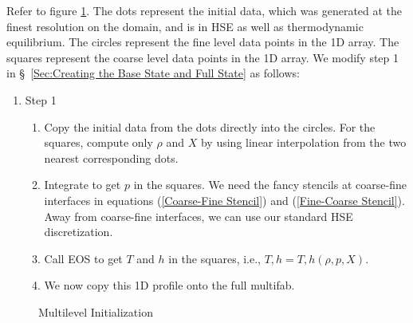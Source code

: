 \documentclass[11pt]{article}
\begin{document}
Refer to figure \ref{Fig:Multilevel Initialization}.  The dots represent the initial data, which was generated at the finest resolution on the domain, and is in HSE as well as thermodynamic equilibrium.  The circles represent the fine level data points in the 1D array.  The squares represent the coarse level data points in the 1D array.  We modify step 1 in \S~\ref{Sec:Creating the Base State and Full State} as follows:
\begin{enumerate}
\item Step 1
\begin{enumerate}
\item Copy the initial data from the dots directly into the circles.  For the squares, compute only $\rho$ and $X$ by using linear interpolation from the two nearest corresponding dots.
\item Integrate to get $p$ in the squares.  We need the fancy stencils at coarse-fine interfaces in equations (\ref{Coarse-Fine Stencil}) and (\ref{Fine-Coarse Stencil}).  Away from coarse-fine interfaces, we can use our standard HSE discretization.
\item Call EOS to get $T$ and $h$ in the squares, i.e., $T,h = T,h(\rho,p,X)$.
\item We now copy this 1D profile onto the full multifab.
\end{enumerate}
\end{enumerate}
\begin{figure}[tpb]
\begin{center}
\caption{Multilevel Initialization}
\label{Fig:Multilevel Initialization}
\end{center}
\end{figure}
\end{document}
